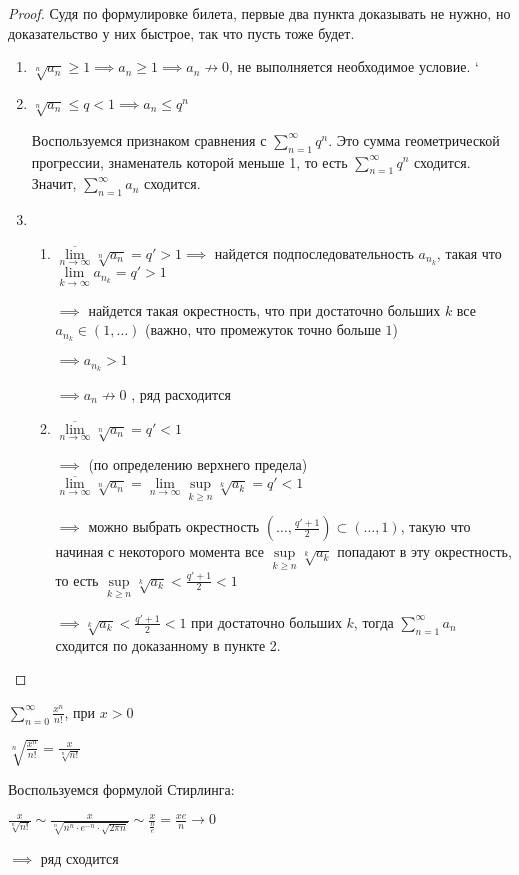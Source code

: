 \begin{proof}\slashns
	
	Судя по формулировке билета, первые два пункта доказывать не нужно, но доказательство у них быстрое, так что пусть тоже будет.
	\begin{enumerate}
		\item $\sqrt[n]{a_n} \ge 1 \implies a_n \ge 1 \implies a_n \not\to 0$, не выполняется необходимое условие.
		`
		\item $\sqrt[n]{a_n} \le q < 1 \implies a_n \le q^n$

		Воспользуемся признаком сравнения с $\sum\limits_{n=1}^{\infty}q^n$. Это сумма геометрической прогрессии, знаменатель которой меньше 1, то есть $\sum\limits_{n=1}^{\infty}q^n$ сходится. Значит, $\sum\limits_{n=1}^{\infty}a_n$ сходится.
		
		
		\item 
		\begin{enumerate}
			\item $\overline{\lim\limits_{n \to \infty}} \sqrt[n]{a_n} = q' > 1 \implies $ найдется подпоследовательность  $a_{n_k}$, такая что $\lim\limits_{k \to \infty} a_{n_k} = q' > 1$

			$\implies$ найдется такая окрестность, что при достаточно больших $k$ все $a_{n_k} \in (1, \dots)$ (важно, что промежуток точно больше $1$) 

			$\implies a_{n_k} > 1$

			$\implies a_n \not\to 0$ , ряд расходится


			\item $\overline{\lim\limits_{n \to \infty}} \sqrt[n]{a_n} = q'< 1$

			$\implies$ (по определению верхнего предела) $\overline{\lim\limits_{n \to \infty}} \sqrt[n]{a_n} = \lim\limits_{n \to \infty} \sup\limits_{k \ge n} \sqrt[k]{a_k} = q' < 1$
		

			$\implies$ можно выбрать окрестность $(\dots, \frac{q' + 1}{2}) \subset (\dots, 1)$, такую что начиная с некоторого момента все $\sup\limits_{k \ge n} \sqrt[k]{a_k}$ попадают в эту окрестность, то есть $\sup\limits_{k \ge n} \sqrt[k]{a_k} < \frac{q' + 1}{2} < 1$

			$\implies \sqrt[k]{a_k} < \frac{q' + 1}{2} < 1$ при достаточно больших $k$, тогда $\sum\limits_{n=1}^{\infty}a_n$ сходится по доказанному в пункте 2.

	\end{enumerate}
	\end{enumerate}
\end{proof}
\begin{example}\slashns
	
	$\sum\limits_{n = 0}^{\infty} \frac{x^n}{n!}$, при $x > 0$
	
		
	$\sqrt[n]{\frac{x^n}{n!}} = \frac{x}{\sqrt[n]{n!}}$ 

	Воспользуемся формулой Стирлинга:

	$ \frac{x}{\sqrt[n]{n!}} \sim \frac{x}{\sqrt[n]{n^n\cdot e^{-n} \cdot \sqrt{2\pi n}}}\sim \frac x {\frac ne} = \frac{xe}{n} \to 0$

	$\implies $ ряд сходится
\end{example}


